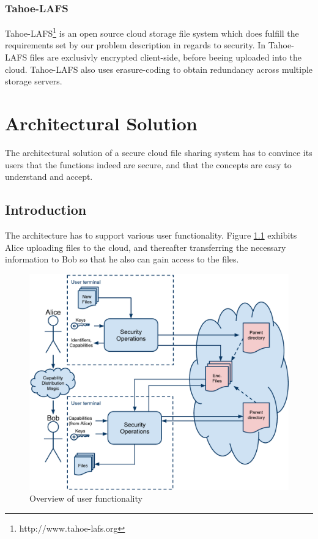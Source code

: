 \documentclass[pdftex,english,10pt,b5paper,twoside]{book}
\begin{document}
\subsection{Tahoe-LAFS}
Tahoe-\ac{LAFS}\footnote{http://www.tahoe-lafs.org} is an open source
cloud storage file system which does fulfill the requirements set by our
problem description in regards to security. In Tahoe-\ac{LAFS} files are
exclusivly encrypted client-side, before beeing uploaded into the cloud.
Tahoe-\ac{LAFS} also uses erasure-coding to obtain redundancy across multiple
storage servers.  


\chapter{Architectural Solution}
\label{chap:AS}

The architectural solution of a secure cloud file sharing system has to convince
its users that the functions indeed are secure, and that the concepts are easy
to understand and accept.

\section{Introduction}

The architecture has to support various user functionality. Figure
\ref{fig:AS:overview} exhibits Alice uploading files to the cloud, and
thereafter transferring the necessary information to Bob so that he also can
gain access to the files.

\begin{figure}[h!]
    \centering
    \includegraphics[width=\columnwidth]{ArchitectureOverview.pdf}
    \caption{Overview of user functionality}
    \label{fig:AS:overview}
\end{figure}
\end{document}
